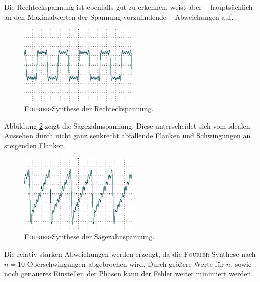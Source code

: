 Die Rechteckspannung ist ebenfalls gut zu erkennen, weist aber -- hauptsächlich an den Maximalwerten der Spannung vorzufindende -- Abweichungen auf. 
\begin{figure}[ht]
	\centering
		\includegraphics[width=0.5\textwidth]{Bilder/1-9_RE.pdf}		
\caption{\textsc{Fourier}-Synthese der Rechteckspannung. \cite{gimp}}
	\label{fig:1-9_RE}
\end{figure}
Abbildung \ref{fig:1-9_SZ} zeigt die Sägezahnspannung. Diese unterscheidet sich vom idealen Aussehen durch nicht ganz senkrecht abfallende Flanken und Schwingungen an steigenden Flanken.
\begin{figure}[ht]
	\centering
		\includegraphics[width=0.5\textwidth]{Bilder/1-9_SZ.pdf}		
\caption{\textsc{Fourier}-Synthese der Sägezahnspannung. \cite{gimp}}
	\label{fig:1-9_SZ}
\end{figure}

Die relativ starken Abweichungen werden erzeugt, da die \textsc{Fourier}-Synthese nach $n=10$ Oberschwingungen abgebrochen wird. Durch größere Werte für $n$, sowie noch genaueres Einstellen der Phasen kann der Fehler weiter minimiert werden.
